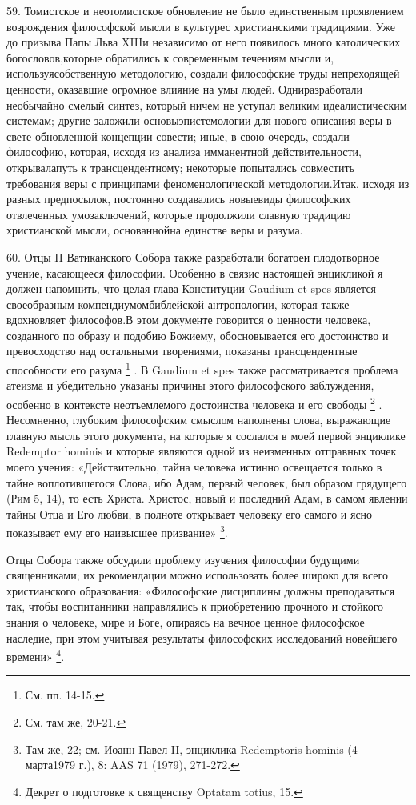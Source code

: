 \documentclass[a5paper,10pt]{article}
\begin{document}
59. Томистское и неотомистское обновление не было единственным проявлением
возрождения философской мысли в культурес христианскими традициями. Уже до
призыва Папы Льва XIIIи независимо от него появилось много католических
богословов,которые обратились к современным течениям мысли и,
используясобственную методологию, создали философские труды непреходящей
ценности, оказавшие огромное влияние на умы людей. Одниразработали необычайно
смелый синтез, который ничем не уступал великим идеалистическим системам;
другие заложили основыэпистемологии для нового описания веры в свете
обновленной концепции совести; иные, в свою очередь, создали философию,
которая, исходя из анализа имманентной действительности, открывалапуть к
трансцендентному; некоторые попытались совместить требования веры с принципами
феноменологической методологии.Итак, исходя из разных предпосылок, постоянно
создавались новыевиды философских отвлеченных умозаключений, которые продолжили
славную традицию христианской мысли, основаннойна единстве веры и разума.

60. Отцы II Ватиканского Собора также разработали богатоеи плодотворное учение,
касающееся философии. Особенно в связис настоящей энцикликой я должен
напомнить, что целая глава Конституции Gaudium et spes является своеобразным
компендиумомбиблейской антропологии, которая также вдохновляет философов.В этом
документе говорится о ценности человека, созданного по образу и подобию
Божиему, обосновывается его достоинство и превосходство над остальными
творениями, показаны трансцендентные способности его разума \footnote{См. пп.
14-15.} . В Gaudium et spes также рассматривается проблема атеизма и
убедительно указаны причины этого философского заблуждения, особенно в
контексте неотъемлемого достоинства человека и его свободы \footnote{См. там
же, 20-21.} . Несомненно, глубоким философским смыслом наполнены слова,
выражающие главную мысль этого документа, на которые я сослался в моей первой
энциклике Redemptor hominis и которые являются одной из неизменных отправных
точек моего учения: «Действительно, тайна человека истинно освещается только в
тайне воплотившегося Слова, ибо Адам, первый человек, был образом грядущего
(Рим 5, 14), то есть Христа.  Христос, новый и последний Адам, в самом явлении
тайны Отца и Его любви, в полноте открывает человеку его самого и ясно
показывает ему его наивысшее призвание» \footnote{Там же, 22; см. Иоанн Павел
    II, энциклика Redemptoris hominis (4 марта1979 г.), 8: AAS 71 (1979),
271-272.}.

Отцы Собора также обсудили проблему изучения философии будущими священниками;
их рекомендации можно использовать более широко для всего христианского
образования: «Философские дисциплины должны преподаваться так, чтобы
воспитанники направлялись к приобретению прочного и стойкого знания о человеке,
мире и Боге, опираясь на вечное ценное философское наследие, при этом учитывая
результаты философских исследований новейшего времени» \footnote{Декрет о
подготовке к священству Optatam totius, 15.}.
\end{document}
